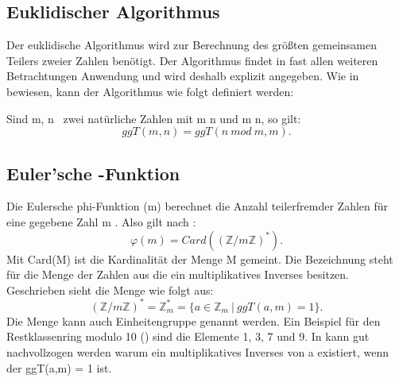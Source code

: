 	\subsection*{Euklidischer Algorithmus}
		Der euklidische Algorithmus wird zur Berechnung des größten gemeinsamen Teilers zweier Zahlen benötigt. Der Algorithmus findet in fast allen weiteren Betrachtungen Anwendung und wird deshalb explizit angegeben. Wie in \cite{Diskrete:Strukturen} bewiesen, kann der Algorithmus wie folgt definiert werden:
		
		\wup Sind m, n \myin {}\ zwei natürliche Zahlen mit m \myKleinerGleich n und m \myNichtTeiler n, so gilt:
		\begin{displaymath}
		ggT(m, n) = ggT(n~mod~m, m).
		\end{displaymath}
		
	\subsection*{Euler’sche \myPhi -Funktion}
		Die Eulersche phi-Funktion \myPhi(m) berechnet die Anzahl teilerfremder Zahlen für eine gegebene Zahl m . Also gilt nach \cite{Algorithmische:Zahlentheorie}: 
		\begin{displaymath}
		\varphi(m) = Card((\mathbb{Z}/m\mathbb{Z})^*).
		\end{displaymath}			
		Mit Card(M) ist die Kardinalität der Menge M gemeint. Die Bezeichnung  steht für die Menge der Zahlen aus  die ein multiplikatives Inverses besitzen. Geschrieben sieht die Menge wie folgt aus:
		\begin{displaymath}
		(\mathbb{Z}/m\mathbb{Z})^* = \mathbb{Z}_m^* = \{a \in \mathbb{Z}_m ~|~ggT(a,m) = 1\}.
		\end{displaymath}
		Die Menge  kann auch Einheitengruppe genannt werden. Ein Beispiel für den Restklassenring modulo 10 () sind die Elemente 1, 3, 7 und 9. In \cite{Mathematik:fuer:Informatiker} kann gut nachvollzogen werden warum ein multiplikatives Inverses von a existiert, wenn der ggT(a,m) = 1 ist.
